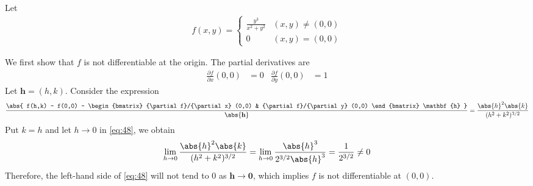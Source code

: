 \documentclass[thmcnt=section, 12pt]{elegantbook}
\begin{document}
\begin{example}
    Let 
    \begin{align*}
        f(x,y) = \begin{cases}
            \frac{y^3}{x^2 + y^2} &(x,y) \neq (0,0) \\ 
            0 &(x,y) = (0,0)
        \end{cases}
    \end{align*}

    \par We first show that $f$ is not differentiable at the origin. The partial derivatives are 
    \begin{align*}
        \frac{\partial f}{\partial x} (0,0)&= 0 &
        \frac{\partial f}{\partial y} (0,0) &= 1
    \end{align*}
    Let $\mathbf{h} = (h,k)$. Consider the expression
    \begin{align}
        \frac{\abs{
            f(h,k) - f(0,0) - \begin{bmatrix}
                {\partial f}/{\partial x} (0,0) & {\partial f}/{\partial y} (0,0)
            \end{bmatrix} \mathbf{h}
        }}{\abs{\mathbf{h}}}
        = \frac{\abs{h}^2 \abs{k}}{(h^2 + k^2)^{3/2}}
        \label{eq:48}
    \end{align}
    Put $k = h$ and let $h \to 0$ in \eqref{eq:48}, we obtain
    \begin{align*}
        \lim_{h \to 0} \frac{\abs{h}^2 \abs{k}}{(h^2 + k^2)^{3/2}}
        = \lim_{h \to 0} \frac{\abs{h}^3}{2^{3/2} \abs{h}^3}
        = \frac{1}{2^{3/2}} \neq 0
    \end{align*}
    Therefore, the left-hand side of \eqref{eq:48} will not tend to $0$ as $\mathbf{h} \to \mathbf{0}$, which implies $f$ is not differentiable at $(0,0)$.


\end{example}
\end{document}
